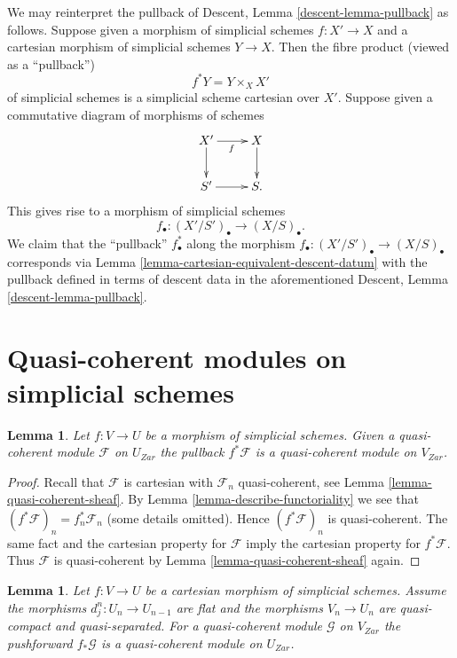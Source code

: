 \documentclass{stacks-project}
\theoremstyle{plain}
\newtheorem{lemma}[subsection]{Lemma}
\theoremstyle{definition}
\theoremstyle{remark}
\numberwithin{equation}{subsection}
\begin{document}
\noindent
We may reinterpret the pullback of
Descent, Lemma \ref{descent-lemma-pullback} as follows.
Suppose given a morphism of simplicial schemes $f : X' \to X$ and a
cartesian morphism of simplicial schemes $Y \to X$. Then
the fibre product (viewed as a ``pullback'')
$$
f^*Y = Y \times_X X'
$$
of simplicial schemes is a simplicial scheme cartesian over $X'$.
Suppose given a commutative diagram of morphisms of schemes
$$
\xymatrix{
X' \ar[r]_f \ar[d] & X \ar[d] \\
S' \ar[r] & S.
}
$$
This gives rise to a morphism of simplicial schemes
$$
f_\bullet : (X'/S')_\bullet \longrightarrow (X/S)_\bullet.
$$
We claim that the ``pullback'' $f_\bullet^*$ along the morphism
$f_\bullet : (X'/S')_\bullet \to (X/S)_\bullet$ corresponds via
Lemma \ref{lemma-cartesian-equivalent-descent-datum}
with the pullback defined in terms of descent data in
the aforementioned
Descent, Lemma \ref{descent-lemma-pullback}.







\section{Quasi-coherent modules on simplicial schemes}
\label{section-modules-simplicial}

\begin{lemma}
\label{lemma-pullback-cartesian-module}
Let $f : V \to U$ be a morphism of simplicial schemes. Given a
quasi-coherent module $\mathcal{F}$ on $U_{Zar}$ the pullback
$f^*\mathcal{F}$ is a quasi-coherent module on $V_{Zar}$.
\end{lemma}

\begin{proof}
Recall that $\mathcal{F}$ is cartesian with $\mathcal{F}_n$
quasi-coherent, see Lemma \ref{lemma-quasi-coherent-sheaf}.
By Lemma \ref{lemma-describe-functoriality} we see that
$(f^*\mathcal{F})_n = f_n^*\mathcal{F}_n$ (some details omitted).
Hence $(f^*\mathcal{F})_n$ is quasi-coherent.
The same fact and the cartesian property for $\mathcal{F}$
imply the cartesian property for $f^*\mathcal{F}$.
Thus $\mathcal{F}$ is quasi-coherent by
Lemma \ref{lemma-quasi-coherent-sheaf} again.
\end{proof}

\begin{lemma}
\label{lemma-pushforward-cartesian-module}
Let $f : V \to U$ be a cartesian morphism of simplicial schemes.
Assume the morphisms $d^n_j : U_n \to U_{n - 1}$ are
flat and the morphisms $V_n \to U_n$ are quasi-compact and quasi-separated.
For a quasi-coherent module $\mathcal{G}$ on $V_{Zar}$
the pushforward $f_*\mathcal{G}$ is a quasi-coherent module on $U_{Zar}$.
\end{lemma}
\end{document}
